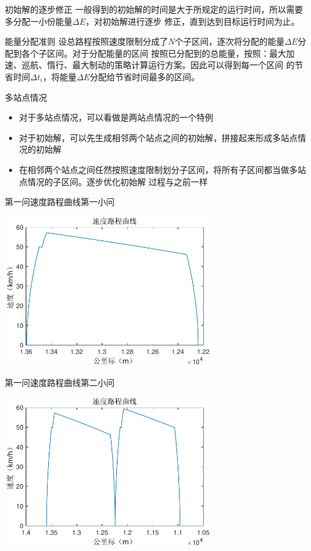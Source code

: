 \documentclass{beamer}
\begin{document}
\begin{frame}{初始解的逐步修正}
一般得到的初始解的时间是大于所规定的运行时间，所以需要多分配一小份能量$\Delta E$，对初始解进行逐步
修正，直到达到目标运行时间为止。

\begin{block}{能量分配准则}
设总路程按照速度限制分成了$N$个子区间，逐次将分配的能量$\Delta E$分配到各个子区间。对于分配能量的区间
按照已分配到的总能量，按照：最大加速、巡航、惰行、最大制动的策略计算运行方案。因此可以得到每一个区间
的节省时间$\Delta t_i$，将能量$\Delta E$分配给节省时间最多的区间。
\end{block}
\end{frame}

\begin{frame}{多站点情况}
\begin{itemize}
  \item 对于多站点情况，可以看做是两站点情况的一个特例
  \item 对于初始解，可以先生成相邻两个站点之间的初始解，拼接起来形成多站点情况的初始解
  \item 在相邻两个站点之间任然按照速度限制划分子区间，将所有子区间都当做多站点情况的子区间。逐步优化初始解
  过程与之前一样
\end{itemize}
\end{frame}

\begin{frame}{第一问速度路程曲线}{第一小问}
\begin{center}
\includegraphics[width=9cm]{fig/fig9/fig9.pdf}
\end{center}
\end{frame}

\begin{frame}{第一问速度路程曲线}{第二小问}
\begin{center}
\includegraphics[width=9cm]{fig/fig10/fig10.pdf}
\end{center}
\end{frame}
\end{document}
